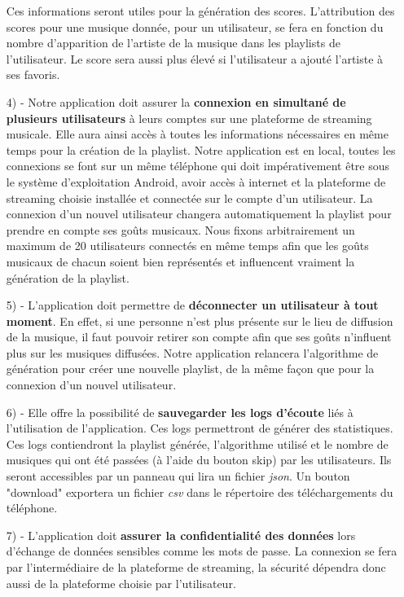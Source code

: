 \documentclass[12pt, openany]{report}
\begin{document}
\begin{itemize}
\begin{itemize}
\end{itemize}
Ces informations seront utiles pour la génération des scores. L'attribution des scores pour une musique donnée, pour un utilisateur, se fera en fonction du nombre d'apparition de l'artiste de la musique dans les playlists de l'utilisateur. Le score sera aussi plus élevé si l'utilisateur a ajouté l'artiste à ses favoris.
\\
\item[4) -] Notre application doit assurer la \textbf{connexion en simultané de plusieurs utilisateurs} à leurs comptes sur une plateforme de streaming musicale. Elle aura ainsi accès à toutes les informations nécessaires en même temps pour la création de la playlist. Notre application est en local, toutes les connexions se font sur un même téléphone qui doit impérativement être sous le système d'exploitation Android, avoir accès à internet et la plateforme de streaming choisie installée et connectée sur le compte d'un utilisateur. La connexion d'un nouvel utilisateur changera automatiquement la playlist pour prendre en compte ses goûts musicaux. Nous fixons arbitrairement un maximum de 20 utilisateurs connectés en même temps afin que les goûts musicaux de chacun soient bien représentés et influencent vraiment la génération de la playlist.
\\
\item[5) -] L'application doit permettre de \textbf{déconnecter un utilisateur à tout moment}. En effet, si une personne n'est plus présente sur le lieu de diffusion de la musique, il faut pouvoir retirer son compte afin que ses goûts n'influent plus sur les musiques diffusées. Notre application relancera l'algorithme de génération pour créer une nouvelle playlist, de la même façon que pour la connexion d'un nouvel utilisateur.
\\
\item[6) -] Elle offre la possibilité de \textbf{sauvegarder les logs d'écoute} liés à l'utilisation de l'application. Ces logs permettront de générer des statistiques. Ces logs contiendront la playlist générée, l'algorithme utilisé et le nombre de musiques qui ont été passées (à l'aide du bouton skip) par les utilisateurs. Ils seront accessibles par un panneau qui lira un fichier \textit{json}. Un bouton "download" exportera un fichier \textit{csv} dans le répertoire des téléchargements du téléphone.
\\
\item[7) -] L'application doit \textbf{assurer la confidentialité des données} lors d'échange de données sensibles comme les mots de passe. La connexion se fera par l'intermédiaire de la plateforme de streaming, la sécurité dépendra donc aussi de la plateforme choisie par l'utilisateur.

\end{itemize}
\end{document}
